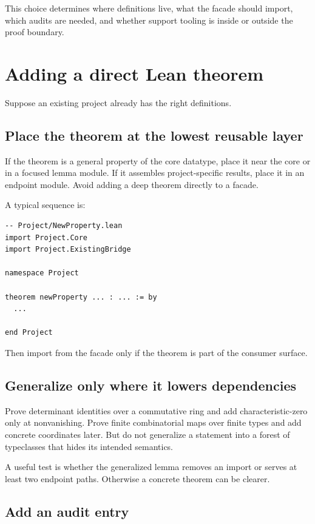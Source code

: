 \documentclass[
  10pt,
  a4paper,
  twoside,
  open=any,
  parskip=half,
  headings=big
]{scrreprt}
\newcommand{\code}[1]{\texttt{\detokenize{#1}}}
\begin{document}
This choice determines where definitions live, what the facade should import,
which audits are needed, and whether support tooling is inside or outside the
proof boundary.

\section{Adding a direct Lean theorem}

Suppose an existing project already has the right definitions.

\subsection{Place the theorem at the lowest reusable layer}

If the theorem is a general property of the core datatype, place it near the
core or in a focused lemma module.  If it assembles project-specific results,
place it in an endpoint module.  Avoid adding a deep theorem directly to a
facade.

A typical sequence is:

\begin{lstlisting}[language=Lean]
-- Project/NewProperty.lean
import Project.Core
import Project.ExistingBridge

namespace Project

theorem newProperty ... : ... := by
  ...

end Project
\end{lstlisting}

Then import \code{Project.NewProperty} from the facade only if the theorem is
part of the consumer surface.

\subsection{Generalize only where it lowers dependencies}

Prove determinant identities over a commutative ring and add
characteristic-zero only at nonvanishing.  Prove finite combinatorial maps over
finite types and add concrete coordinates later.  But do not generalize a
statement into a forest of typeclasses that hides its intended semantics.

A useful test is whether the generalized lemma removes an import or serves at
least two endpoint paths.  Otherwise a concrete theorem can be clearer.

\subsection{Add an audit entry}
\end{document}
